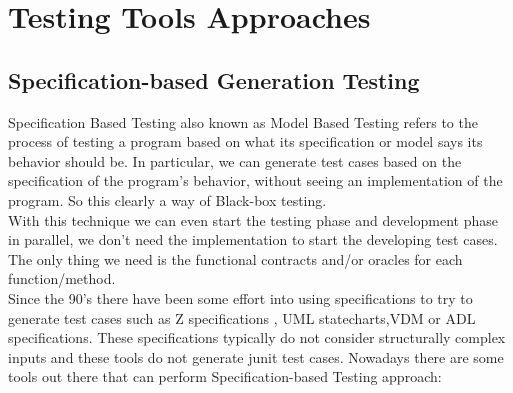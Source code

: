 \documentclass[10pt, conference, compsocconf]{IEEEtran}
\begin{document}
\section{Testing Tools Approaches}\label{testingapproaches}

\subsection{Specification-based Generation Testing}
Specification Based Testing also known as Model Based Testing refers to the process of testing a program based on what its specification or model says its behavior should be.
In particular, we can generate test cases based on the specification of the program's behavior, without seeing an implementation of the program. So this clearly a
way of Black-box testing.\\
With this technique we can even start the testing phase and development phase in parallel, we don't need the implementation
to start the developing test cases. The only thing we need is the functional contracts and/or oracles for each function/method.\\
Since the 90's there have been some effort into using specifications to try to generate test cases such as Z specifications
\cite{Horcher95improvingsoftware,Stocks:1996:FST:239916.239918}, UML statecharts\cite{Offutt:1999:GTU:1767297.1767341},VDM\cite{Aichernig99automatedblack-box}
or ADL specifications\cite{Sankar94specifyingand}.
These specifications typically do not consider structurally complex inputs and these tools do not generate junit test cases.
Nowadays there are some tools out there that can perform Specification-based Testing approach:
\end{document}
